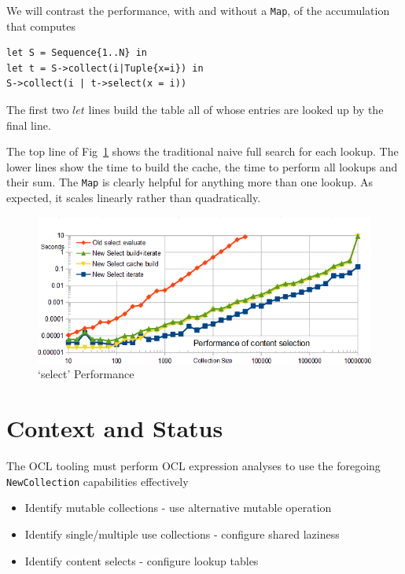 \documentclass{llncs}
\begin{document}
We will contrast the performance, with and without a \verb$Map$, of the accumulation that computes 

\begin{verbatim}
let S = Sequence{1..N} in
let t = S->collect(i|Tuple{x=i}) in
S->collect(i | t->select(x = i))
\end{verbatim}

The first two $let$ lines build the table all of whose entries are looked up by the final line.

The top line of Fig~\ref{fig:SelectionPerformance} shows the traditional naive full search for each lookup. The lower lines show the time to build the cache, the time to perform all lookups and their sum. The \verb$Map$ is clearly helpful for anything more than one lookup. As expected, it scales linearly rather than quadratically.

\begin{figure}
	\begin{center}
		\includegraphics[width=4.5in]{SelectionPerformance.png}
	\end{center}
	\caption{`select' Performance}
	\label{fig:SelectionPerformance}
\end{figure}
  
\section{Context and Status}\label{Context and Status}

The OCL tooling must perform OCL expression analyses to use the foregoing \verb$NewCollection$ capabilities effectively
\begin{itemize}
	\item Identify mutable collections - use alternative mutable operation
	\item Identify single/multiple use collections - configure shared laziness
	\item Identify content selects - configure lookup tables
\end{itemize}
\end{document}
